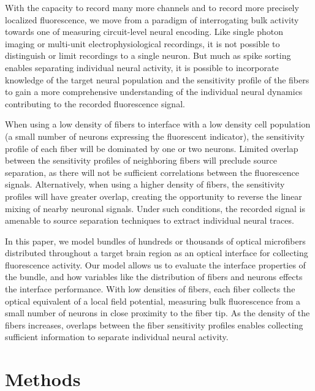 With the capacity to record many more channels and to record more precisely localized fluorescence, we move from a paradigm of interrogating bulk activity towards one of measuring circuit-level neural encoding. Like single photon imaging or multi-unit electrophysiological recordings, it is not possible to distinguish or limit recordings to a single neuron. But much as spike sorting enables separating individual neural activity, it is possible to incorporate knowledge of the target neural population and the sensitivity profile of the fibers to gain a more comprehensive understanding of the individual neural dynamics contributing to the recorded fluorescence signal. 

When using a low density of fibers to interface with a low density cell population (a small number of neurons expressing the fluorescent indicator), the sensitivity profile of each fiber will be dominated by one or two neurons. Limited overlap between the sensitivity profiles of neighboring fibers will preclude source separation, as there will not be sufficient correlations between the fluorescence signals. Alternatively, when using a higher density of fibers, the sensitivity profiles will have greater overlap, creating the opportunity to reverse the linear mixing of nearby neuronal signals. Under such conditions, the recorded signal is amenable to source separation techniques to extract individual neural traces.

In this paper, we model bundles of hundreds or thousands of optical microfibers distributed throughout a target brain region as an optical interface for collecting fluorescence activity. Our model allows us to evaluate the interface properties of the bundle, and how variables like the distribution of fibers and neurons effects the interface performance. With low densities of fibers, each fiber collects the optical equivalent of a local field potential, measuring bulk fluorescence from a small number of neurons in close proximity to the fiber tip. As the density of the fibers increases, overlaps between the fiber sensitivity profiles enables collecting sufficient information to separate individual neural activity.

\section{Methods}
\label{sec:methods-modeling}

